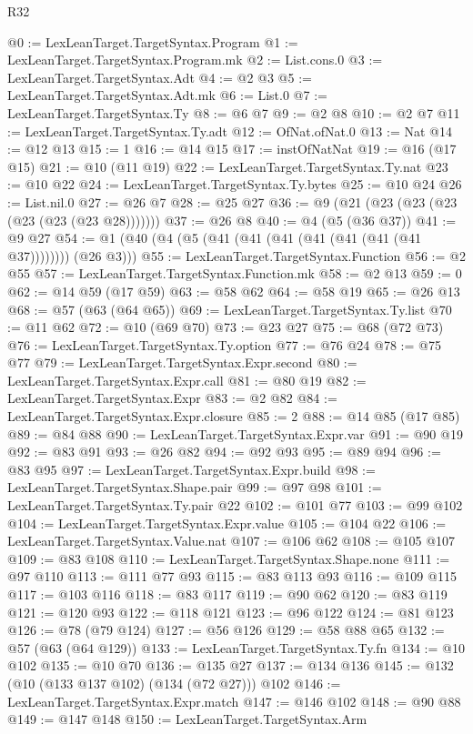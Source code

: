 \begin{lexlean}{R32}
\begin{coremodule}
@0 := LexLeanTarget.TargetSyntax.Program
@1 := LexLeanTarget.TargetSyntax.Program.mk
@2 := List.cons.{0}
@3 := LexLeanTarget.TargetSyntax.Adt
@4 := @2 @3
@5 := LexLeanTarget.TargetSyntax.Adt.mk
@6 := List.{0}
@7 := LexLeanTarget.TargetSyntax.Ty
@8 := @6 @7
@9 := @2 @8
@10 := @2 @7
@11 := LexLeanTarget.TargetSyntax.Ty.adt
@12 := OfNat.ofNat.{0}
@13 := Nat
@14 := @12 @13
@15 := 1
@16 := @14 @15
@17 := instOfNatNat
@19 := @16 (@17 @15)
@21 := @10 (@11 @19)
@22 := LexLeanTarget.TargetSyntax.Ty.nat
@23 := @10 @22
@24 := LexLeanTarget.TargetSyntax.Ty.bytes
@25 := @10 @24
@26 := List.nil.{0}
@27 := @26 @7
@28 := @25 @27
@36 := @9 (@21 (@23 (@23 (@23 (@23 (@23 (@23 @28)))))))
@37 := @26 @8
@40 := @4 (@5 (@36 @37))
@41 := @9 @27
@54 := @1 (@40 (@4 (@5 (@41 (@41 (@41 (@41 (@41 (@41 (@41 @37)))))))) (@26 @3)))
@55 := LexLeanTarget.TargetSyntax.Function
@56 := @2 @55
@57 := LexLeanTarget.TargetSyntax.Function.mk
@58 := @2 @13
@59 := 0
@62 := @14 @59 (@17 @59)
@63 := @58 @62
@64 := @58 @19
@65 := @26 @13
@68 := @57 (@63 (@64 @65))
@69 := LexLeanTarget.TargetSyntax.Ty.list
@70 := @11 @62
@72 := @10 (@69 @70)
@73 := @23 @27
@75 := @68 (@72 @73)
@76 := LexLeanTarget.TargetSyntax.Ty.option
@77 := @76 @24
@78 := @75 @77
@79 := LexLeanTarget.TargetSyntax.Expr.second
@80 := LexLeanTarget.TargetSyntax.Expr.call
@81 := @80 @19
@82 := LexLeanTarget.TargetSyntax.Expr
@83 := @2 @82
@84 := LexLeanTarget.TargetSyntax.Expr.closure
@85 := 2
@88 := @14 @85 (@17 @85)
@89 := @84 @88
@90 := LexLeanTarget.TargetSyntax.Expr.var
@91 := @90 @19
@92 := @83 @91
@93 := @26 @82
@94 := @92 @93
@95 := @89 @94
@96 := @83 @95
@97 := LexLeanTarget.TargetSyntax.Expr.build
@98 := LexLeanTarget.TargetSyntax.Shape.pair
@99 := @97 @98
@101 := LexLeanTarget.TargetSyntax.Ty.pair @22
@102 := @101 @77
@103 := @99 @102
@104 := LexLeanTarget.TargetSyntax.Expr.value
@105 := @104 @22
@106 := LexLeanTarget.TargetSyntax.Value.nat
@107 := @106 @62
@108 := @105 @107
@109 := @83 @108
@110 := LexLeanTarget.TargetSyntax.Shape.none
@111 := @97 @110
@113 := @111 @77 @93
@115 := @83 @113 @93
@116 := @109 @115
@117 := @103 @116
@118 := @83 @117
@119 := @90 @62
@120 := @83 @119
@121 := @120 @93
@122 := @118 @121
@123 := @96 @122
@124 := @81 @123
@126 := @78 (@79 @124)
@127 := @56 @126
@129 := @58 @88 @65
@132 := @57 (@63 (@64 @129))
@133 := LexLeanTarget.TargetSyntax.Ty.fn
@134 := @10 @102
@135 := @10 @70
@136 := @135 @27
@137 := @134 @136
@145 := @132 (@10 (@133 @137 @102) (@134 (@72 @27))) @102
@146 := LexLeanTarget.TargetSyntax.Expr.match
@147 := @146 @102
@148 := @90 @88
@149 := @147 @148
@150 := LexLeanTarget.TargetSyntax.Arm

\end{coremodule}
\end{lexlean}
